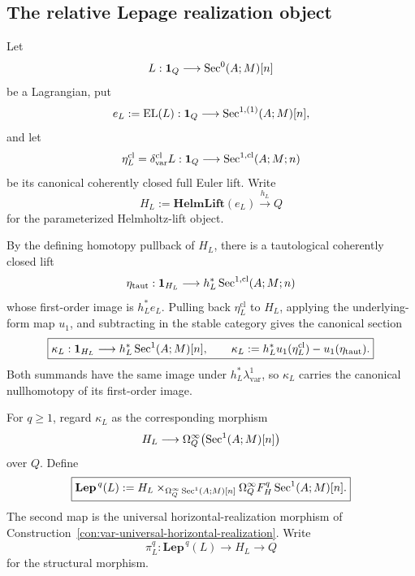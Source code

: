 \subsection{The relative Lepage realization object}

\begin{construction}
\label{con:var-lepage-difference}
Let
\[
    L:\mathbf 1_Q\longrightarrow\operatorname{Sec}^0(A;M)[n]
\]
be a Lagrangian, put
\[
    e_L:=\operatorname{EL}(L):
    \mathbf 1_Q\longrightarrow\operatorname{Sec}^{1,(1)}(A;M)[n],
\]
and let
\[
    \eta_L^{\mathrm{cl}}
    =
    \delta_{\mathrm{var}}^{\mathrm{cl}}L:
    \mathbf 1_Q\longrightarrow
    \operatorname{Sec}^{1,\mathrm{cl}}(A;M;n)
\]
be its canonical coherently closed full Euler lift.  Write
\[
    H_L:=\mathbf{HelmLift}(e_L)
    \xrightarrow{h_L}Q
\]
for the parameterized Helmholtz-lift object.

By the defining homotopy pullback of \(H_L\), there is a tautological coherently closed lift
\[
    \eta_{\mathrm{taut}}:
    \mathbf 1_{H_L}
    \longrightarrow
    h_L^*\operatorname{Sec}^{1,\mathrm{cl}}(A;M;n)
\]
whose first-order image is \(h_L^*e_L\).  Pulling back \(\eta_L^{\mathrm{cl}}\) to \(H_L\), applying the underlying-form map \(u_1\), and subtracting in the stable category gives the canonical section
\[
    \boxed{
    \kappa_L:
    \mathbf 1_{H_L}
    \longrightarrow
    h_L^*\operatorname{Sec}^1(A;M)[n],
    \qquad
    \kappa_L
    :=
    h_L^*u_1(\eta_L^{\mathrm{cl}})
    -
    u_1(\eta_{\mathrm{taut}}).
    }
\]
Both summands have the same image under \(h_L^*\lambda^1_{\mathrm{var}}\), so \(\kappa_L\) carries the canonical nullhomotopy of its first-order image.
\end{construction}

\begin{definition}
\label{def:var-lepage-object}
For \(q\ge1\), regard \(\kappa_L\) as the corresponding morphism
\[
    H_L\longrightarrow
    \Omega_Q^\infty\bigl(\operatorname{Sec}^1(A;M)[n]\bigr)
\]
over \(Q\).  Define
\[
    \boxed{
    \mathbf{Lep}^{\,q}(L)
    :=
    H_L
    \times_{\Omega_Q^\infty\operatorname{Sec}^1(A;M)[n]}
    \Omega_Q^\infty F_H^q\operatorname{Sec}^1(A;M)[n].
    }
\]
The second map is the universal horizontal-realization morphism of Construction~\ref{con:var-universal-horizontal-realization}.  Write
\[
    \pi_L^q:\mathbf{Lep}^{\,q}(L)\longrightarrow H_L\longrightarrow Q
\]
for the structural morphism.
\end{definition}


